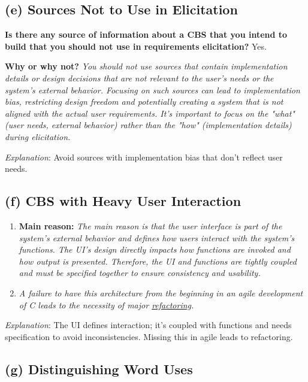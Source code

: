 \documentclass{article}
\begin{document}
\subsection*{(e) Sources Not to Use in Elicitation}

\textbf{Is there any source of information about a CBS that you intend to build that you should not use in requirements elicitation?} Yes.

\textbf{Why or why not?} \textit{You should not use sources that contain implementation details or design decisions that are not relevant to the user's needs or the system's external behavior. Focusing on such sources can lead to implementation bias, restricting design freedom and potentially creating a system that is not aligned with the actual user requirements. It's important to focus on the "what" (user needs, external behavior) rather than the "how" (implementation details) during elicitation.}

\textit{Explanation}: Avoid sources with implementation bias that don't reflect user needs.

\subsection*{(f) CBS with Heavy User Interaction}

\begin{enumerate}[label=(\roman*)]
    \item \textbf{Main reason:} \textit{The main reason is that the user interface is part of the system's external behavior and defines how users interact with the system's functions. The UI's design directly impacts how functions are invoked and how output is presented. Therefore, the UI and functions are tightly coupled and must be specified together to ensure consistency and usability.}
    \item \textit{A failure to have this architecture from the beginning in an agile development of C leads to the necessity of major \underline{refactoring}.}
\end{enumerate}

\textit{Explanation}: The UI defines interaction; it's coupled with functions and needs specification to avoid inconsistencies. Missing this in agile leads to refactoring.

\subsection*{(g) Distinguishing Word Uses}
\end{document}
